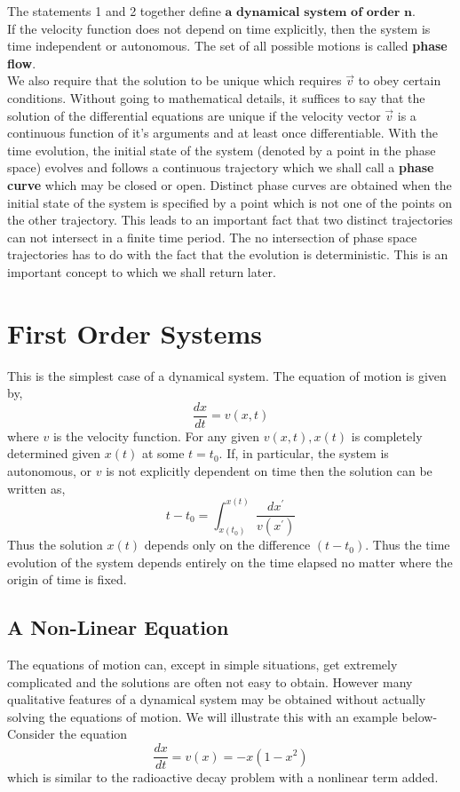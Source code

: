 The statements 1 and 2 together define  $\textbf{a dynamical system of order n}$.\\
 If the velocity function does not depend on time explicitly, then the system is time independent or autonomous. The set of all possible motions is called \textbf{phase flow}.\\
We also require that the solution to be unique which requires $\vec{v}$ to obey certain conditions. Without going to mathematical details, it suffices to say that the solution of the differential equations  are unique if the velocity vector $\vec{v}$ is a continuous function of it's arguments and at least once differentiable. With the time evolution, the initial state of the system (denoted by a point in the phase space) evolves and follows a continuous trajectory which we shall call a \textbf{phase curve} which may be closed or open. Distinct phase curves are obtained when the initial state of the system is specified by a point which is not one of the points on the other trajectory. This leads to an important fact that two distinct trajectories can not intersect in a finite time period. The no intersection of phase space trajectories has to do with the fact that the evolution is deterministic. This is an important concept to which we shall return later.
\section{ First Order Systems}
This is the simplest case of a dynamical system. The equation of motion is given by,
$$
\frac{d x}{d t}=v(x, t)
$$
where $v$ is the velocity function. For any given $v(x, t) , x(t)$ is completely determined given $x(t)$ at some $t=t_{0} .$ If, in particular, the system is autonomous, or $v$ is not explicitly dependent on time then the solution can be written as,
$$
t-t_{0}=\int_{x\left(t_{0}\right)}^{x(t)} \frac{d x^{\prime}}{v\left(x^{\prime}\right)}
$$
Thus the solution $x(t)$ depends only on the difference $\left(t-t_{0}\right)$. Thus the time evolution of the system depends entirely on the time elapsed no matter where the origin of time is fixed.
\subsection{ A Non-Linear Equation}
	The equations of motion can, except in simple situations, get extremely complicated and the solutions are often not easy to obtain. However many qualitative features of a dynamical system may be obtained without actually solving the equations of motion. We will illustrate this with an example below- Consider the equation
	$$
	\frac{d x}{d t}=v(x)=-x\left(1-x^{2}\right)
	$$
	which is similar to the radioactive decay problem with a nonlinear term added. 


